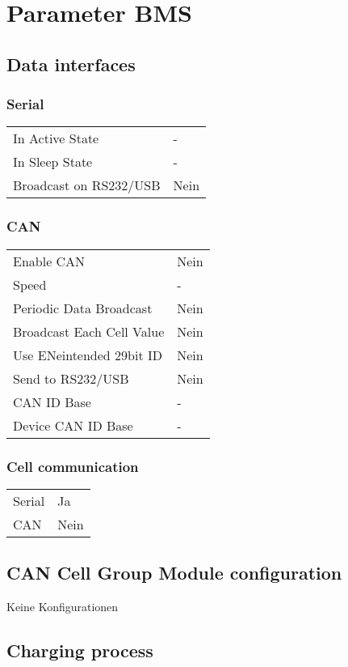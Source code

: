 \chapter{Parameter BMS}\label{anh_bms}
\section*{Data interfaces}
\subsection*{Serial}
\begin{tabular}{p{11cm}p{2cm}}
	In Active State & - \\
	In Sleep State & - \\
	Broadcast on RS232/USB & Nein
\end{tabular}

\subsection*{CAN}
\begin{tabular}{p{11cm}p{2cm}}
	Enable CAN & Nein \\
	Speed & - \\
	Periodic Data Broadcast & Nein \\
	Broadcast Each Cell Value & Nein \\
	Use ENeintended 29bit ID & Nein \\
	Send to RS232/USB & Nein \\
	CAN ID Base & - \\
	Device CAN ID Base & -
\end{tabular}

\subsection*{Cell communication}
\begin{tabular}{p{11cm}p{2cm}}
	Serial & Ja \\
	CAN & Nein
\end{tabular}

\section*{CAN Cell Group Module configuration}
Keine Konfigurationen

\section*{Charging process}
